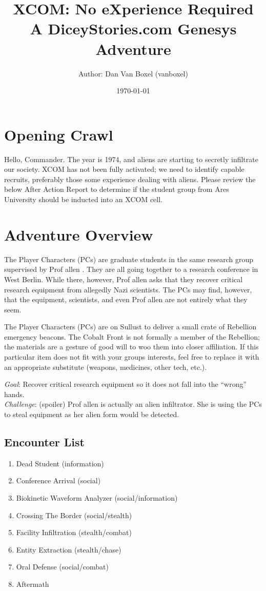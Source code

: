 \documentclass{book}
\title{
    XCOM: No eXperience Required \\
A DiceyStories.com Genesys Adventure\\
}
\author{Author: Dan Van Boxel (vanboxel)}
\date{\today}
\newcommand{\prof}{
    {\color{orange} Prof allen}
}
\begin{document}
\maketitle


\begin{multicols*}{2}
\section{Opening Crawl}

Hello, Commander.  The year is 1974, and aliens are starting to secretly infiltrate our society.  XCOM has not been fully activated; we need to identify capable recruits, preferably those some experience dealing with aliens.  Please review the below After Action Report to determine if the student group from Ares University should be inducted into an XCOM cell.

\section{Adventure Overview }

    The Player Characters (PCs) are graduate students in the same research group supervised by \prof.  They are all going together to a research conference in West Berlin.  While there, however, \prof asks that they recover critical research equipment from allegedly Nazi scientists.  The PCs may find, however, that the equipment, scientists, and even \prof are not entirely what they seem.

    The Player Characters (PCs) are on Sullust to deliver a small crate of Rebellion emergency beacons. The Cobalt Front is not formally a member of the Rebellion; the materials are a gesture of good will to woo them into closer affiliation. If this particular item does not fit with your groups interests, feel free to replace it with an appropriate substitute (weapons, medicines, other tech, etc.).

\emph{Goal}: Recover critical research equipment so it does not fall into the ``wrong'' hands.\\
\emph{Challenge}: (spoiler) \prof is actually an alien infiltrator.  She is using the PCs to steal equipment as her alien form would be detected.\\

\subsection{Encounter List}
\begin{enumerate}
    \item Dead Student (information)
    \item Conference Arrival (social)
    \item Biokinetic Waveform Analyzer (social/information)
    \item Crossing The Border (social/stealth)
    \item Facility Infiltration (stealth/combat)
    \item Entity Extraction (stealth/chase)
    \item Oral Defense (social/combat)
    \item Aftermath
\end{enumerate}


\end{multicols*}
\end{document}
